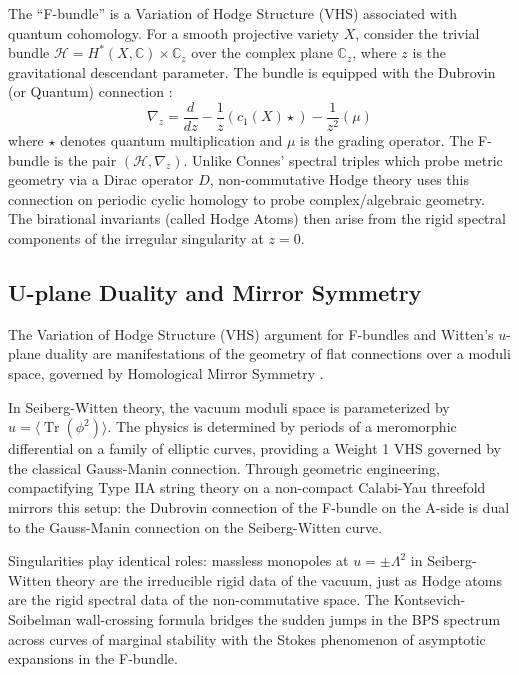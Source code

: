 \documentclass[12pt,reqno]{amsart}
\theoremstyle{remark} \newtheorem{remark}[theorem]{Remark}
\begin{document}
The ``F-bundle'' is a Variation of Hodge Structure (VHS) associated
with quantum cohomology. For a smooth projective variety $X$, consider
the trivial bundle $\mathcal{H} = H^*(X, \mathbb{C}) \times
\mathbb{C}_z$ over the complex plane $\mathbb{C}_z$, where $z$ is the
gravitational descendant parameter. The bundle is equipped with the
Dubrovin (or Quantum) connection \cite{Dubrovin1996}:
\begin{equation}
    \nabla_z = \frac{d}{dz} - \frac{1}{z} (c_1(X) \star) -
    \frac{1}{z^2} (\mu)
\end{equation}
where $\star$ denotes quantum multiplication and $\mu$ is the grading
operator. The F-bundle is the pair $(\mathcal{H}, \nabla_z)$. Unlike
Connes' spectral triples which probe metric geometry via a Dirac
operator $D$, non-commutative Hodge theory uses this connection on
periodic cyclic homology \cite{Loday1992, Iritani2009} to probe complex/algebraic
geometry. The birational invariants (called Hodge Atoms) then arise from the rigid
spectral components of the irregular singularity at $z=0$.

\subsection{U-plane Duality and Mirror Symmetry}
The Variation of Hodge Structure (VHS) argument for F-bundles and Witten's
$u$-plane duality are manifestations of the geometry of flat
connections over a moduli space, governed by Homological Mirror
Symmetry \cite{Kontsevich1994, Auroux2007}.

In Seiberg-Witten theory, the vacuum moduli space is parameterized by
$u = \langle \operatorname{Tr}(\phi^2) \rangle$. The physics is
determined by periods of a meromorphic differential on a family of
elliptic curves, providing a Weight 1 VHS governed by the classical
Gauss-Manin connection. Through geometric engineering, compactifying
Type IIA string theory on a non-compact Calabi-Yau threefold mirrors
this setup: the Dubrovin connection of the F-bundle on the A-side is
dual to the Gauss-Manin connection on the Seiberg-Witten curve.

Singularities play identical roles: massless monopoles at $u = \pm
\Lambda^2$ in Seiberg-Witten theory are the irreducible rigid data of
the vacuum, just as Hodge atoms are the rigid spectral data of the
non-commutative space.
The Kontsevich-Soibelman wall-crossing formula \cite{Kontsevich2008}
bridges the sudden jumps in the BPS spectrum across curves of marginal
stability with the Stokes phenomenon of asymptotic expansions in the
F-bundle.
\end{document}
